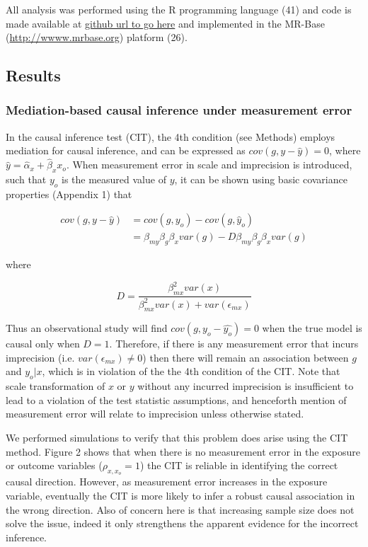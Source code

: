 \documentclass[]{article}
\begin{document}
All analysis was performed using the R programming language (41) and
code is made available at \href{}{github url to go here} and implemented
in the MR-Base (\url{http://wwww.mrbase.org}) platform (26).

\subsection{Results}\label{results}

\subsubsection{Mediation-based causal inference under measurement
error}\label{mediation-based-causal-inference-under-measurement-error}

In the causal inference test (CIT), the 4th condition (see Methods)
employs mediation for causal inference, and can be expressed as
\(cov(g, y - \hat{y}) = 0\), where
\(\hat{y} = \hat{\alpha}_x + \hat{\beta}_x x_o\). When measurement error
in scale and imprecision is introduced, such that \(y_o\) is the
measured value of \(y\), it can be shown using basic covariance
properties (Appendix 1) that

\[
\begin{aligned}
cov(g, y - \hat{y}) & = cov(g, y_o) - cov(g, \hat{y}_o)  \\
                    & = \beta_{my} \beta_g \beta_x var(g) - D \beta_{my} \beta_g \beta_x var(g)
\end{aligned}
\]

where

\[
D = \frac{\beta^2_{mx} var(x)} {\beta^2_{mx} var(x) + var(\epsilon_{mx})}
\]

Thus an observational study will find \(cov(g, y_o - \hat{y_o}) = 0\)
when the true model is causal only when \(D = 1\). Therefore, if there
is any measurement error that incurs imprecision (i.e.
\(var(\epsilon_{mx}) \neq 0\)) then there will remain an association
between \(g\) and \(y_o | x\), which is in violation of the the 4th
condition of the CIT. Note that scale transformation of \(x\) or \(y\)
without any incurred imprecision is insufficient to lead to a violation
of the test statistic assumptions, and henceforth mention of measurement
error will relate to imprecision unless otherwise stated.

We performed simulations to verify that this problem does arise using
the CIT method. Figure 2 shows that when there is no measurement error
in the exposure or outcome variables (\(\rho_{x, x_o}=1\)) the CIT is
reliable in identifying the correct causal direction. However, as
measurement error increases in the exposure variable, eventually the CIT
is more likely to infer a robust causal association in the wrong
direction. Also of concern here is that increasing sample size does not
solve the issue, indeed it only strengthens the apparent evidence for
the incorrect inference.
\end{document}
